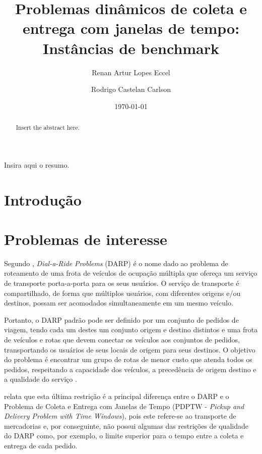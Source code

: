 \documentclass{anpet}
\title{Problemas dinâmicos de coleta e entrega com janelas de tempo: Instâncias de benchmark}
\author{Renan Artur Lopes Eccel}
\author{Rodrigo Castelan Carlson}
\affil{Universidade Federal de Santa Catarina \protect\\ Programa de Pós-Graduação em  Engenharia de Automação e Sistemas}
\date{\today}
\begin{document}
\maketitle

\begin{resumo}
Insira aqui o resumo.
\end{resumo}

\begin{abstract}
Insert the abstract here.
\end{abstract}

\section{Introdução}

\section{Problemas de interesse}
Segundo \textcite{doerner_pickup-and-delivery_2014}, \textit{Dial-a-Ride Problems} (DARP) é o nome dado ao problema de roteamento de uma frota de veículos de ocupação múltipla que ofereça um serviço de transporte porta-a-porta para os seus usuários. O serviço de transporte é compartilhado, de forma que múltiplos usuários, com diferentes origens e/ou destinos, possam ser acomodados simultaneamente em um mesmo veículo.

Portanto, o DARP padrão pode ser definido por um conjunto de pedidos de viagem, tendo cada um destes um conjunto origem e destino distintos e uma frota de veículos e rotas que devem conectar os veículos aos conjuntos de pedidos, transportando os usuários de seus locais de origem para seus destinos. O objetivo do problema é encontrar um grupo de rotas de menor custo que atenda todos os pedidos, respeitando a capacidade dos veículos, a precedência de origem destino e a qualidade do serviço \parencite{cordeau_tabu_2003}. 

\textcite{parragh_survey_2008-1} relata que esta última restrição é a principal diferença entre o DARP e o Problema de Coleta e Entrega com Janelas de Tempo (PDPTW - \textit{Pickup and Delivery Problem with Time Windows}), pois este refere-se ao transporte de mercadorias e, por conseguinte, não possui algumas das restrições de qualidade do DARP como, por exemplo, o limite superior para o tempo entre a coleta e entrega de cada pedido.
\end{document}
